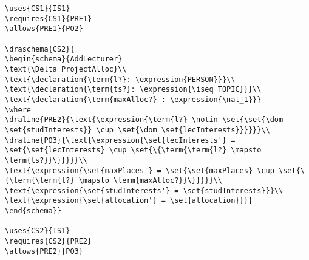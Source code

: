 \begin{verbatim}
\uses{CS1}{IS1}
\requires{CS1}{PRE1}
\allows{PRE1}{PO2}

\draschema{CS2}{
\begin{schema}{AddLecturer}
\text{\Delta ProjectAlloc}\\
\text{\declaration{\term{l?}: \expression{PERSON}}}\\
\text{\declaration{\term{ts?}: \expression{\iseq TOPIC}}}\\
\text{\declaration{\term{maxAlloc?} : \expression{\nat_1}}}
\where
\draline{PRE2}{\text{\expression{\term{l?} \notin \set{\set{\dom \set{studInterests}} \cup \set{\dom \set{lecInterests}}}}}}\\
\draline{PO3}{\text{\expression{\set{lecInterests'} = \set{\set{lecInterests} \cup \set{\{\term{\term{l?} \mapsto \term{ts?}}\}}}}}\\
\text{\expression{\set{maxPlaces'} = \set{\set{maxPlaces} \cup \set{\{\term{\term{l?} \mapsto \term{maxAlloc?}}\}}}}}\\
\text{\expression{\set{studInterests'} = \set{studInterests}}}\\
\text{\expression{\set{allocation'} = \set{allocation}}}}
\end{schema}}

\uses{CS2}{IS1}
\requires{CS2}{PRE2}
\allows{PRE2}{PO3}


\end{verbatim}
